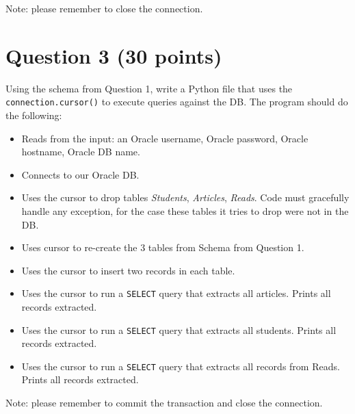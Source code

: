 \documentclass[letterpaper, 11pt]{article}
\begin{document}
Note: please remember to close the connection.

\section*{Question 3 (30 points)}

Using the schema from Question 1, write a Python file that uses the \texttt{connection.cursor()} to execute queries against the DB. The program should do the following:
\begin{itemize}[label=-]
    \item Reads from the input: an Oracle username, Oracle password, Oracle hostname, Oracle DB name.
    \item Connects to our Oracle DB.
    \item Uses the cursor to drop tables \textit{Students}, \textit{Articles}, \textit{Reads}. Code must gracefully handle any exception, for the case these tables it tries to drop were not in the DB. 
    \item Uses cursor to re-create the 3 tables from Schema from Question 1.
    \item Uses the cursor to insert two records in each table.
    \item Uses the cursor to run a \texttt{SELECT} query that extracts all articles. Prints all records extracted.
    \item Uses the cursor to run a \texttt{SELECT} query that extracts all students. Prints all records extracted.
    \item Uses the cursor to run a \texttt{SELECT} query that extracts all records from Reads. Prints all records extracted.
\end{itemize}

Note: please remember to commit the transaction and close the connection.
\end{document}
